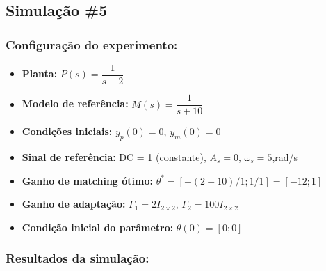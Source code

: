 \documentclass[10pt]{article}
\begin{document}
\newpage

\subsection{Simulação \#5}
\subsubsection{Configuração do experimento:}
\begin{itemize}
\item \textbf{Planta:} $P(s) = \dfrac{1}{s - 2}$
\item \textbf{Modelo de referência:} $M(s) = \dfrac{1}{s + 10}$
\item \textbf{Condições iniciais:} $y_p(0)=0$, $y_m(0)=0$
\item \textbf{Sinal de referência:} DC = 1 (constante), $A_s=0$, $\omega_s=5$,rad/s
\item \textbf{Ganho de matching ótimo:} $\theta^* = [-(2+10)/1;1/1] = [-12;1]$
\item \textbf{Ganho de adaptação:} $\Gamma_1 = 2I_{2\times2}$, $\Gamma_2 = 100 I_{2\times2}$
\item \textbf{Condição inicial do parâmetro:} $\theta(0) = [0;0]$
\end{itemize}

\subsubsection{Resultados da simulação:}
\end{document}
